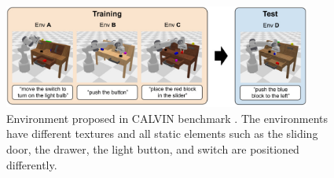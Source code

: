 \begin{figure}[t]
    \centering
    \includegraphics[width=0.9\textwidth]{figures/images/calvin/calvin_env.jpg}
    \caption{Environment proposed in CALVIN benchmark \cite{mees2022calvin}. The environments have different textures and all static elements such as the sliding door, the drawer, the light button, and switch are positioned differently.}
    \label{fig:calvin_env}
\end{figure}
